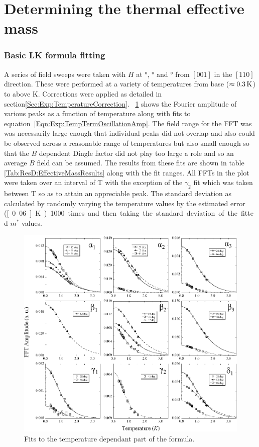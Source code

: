 
\section{Determining the thermal effective mass}


\subsubsection{Basic \ac{LK} formula fitting}

A series of field sweeps were taken with $H$ at \unit[12]{\degree}, \unit[28]{\degree} and \unit[46]{\degree} from $[001]$ in the $[110]$ direction. These were performed at a variety of temperatures from base ($\approx\unit[0.3]{K}$) to above \unit[2]{K}. Corrections were applied as detailed in section\ref{Sec:Exp:TemperatureCorrection}. \Fig~\ref{Fig:ResD:SimpleLKFits} shows the Fourier amplitude of various peaks as a function of temperature along with fits to equation~\ref{Eqn:Exp:TempTermOscillationAmp}. The field range for the FFT was was necessarily large enough that individual peaks did not overlap and also could be observed across a reasonable range of temperatures but also small enough so that the $B$ dependent Dingle factor did not play too large a role and so an average $B$ field can be assumed. The results from these fits are shown in table \ref{Tab:ResD:EffectiveMassResults} along with the fit ranges. All FFTs in the plot were taken over an interval of \unit[12--18]{T} with the exception of the $\gamma_2$ fit which was taken between \unit[16-18]{T} so as to attain an appreciable peak. The standard deviation as calculated by randomly varying the temperature values by the estimated error (\unit[0.06]{K}) 1000 times and then taking the standard deviation of the fitted $m^*$ values.
\begin{figure}[htbp]
    \begin{center}
        \includegraphics[scale=0.9]{Chapter-dHvABaFe2P2/Figures/Mass/SimpleLKFits/SimpleLKFits}
        \caption{Fits to the temperature dependant part of the \LK formula. }
        \label{Fig:ResD:SimpleLKFits}
    \end{center}
\end{figure}
